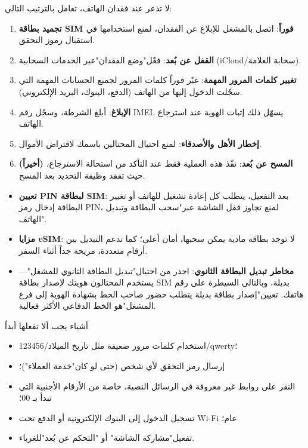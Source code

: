 
لا تذعر عند فقدان الهاتف، تعامل بالترتيب التالي:

\begin{enumerate}
  \item \textbf{تجميد بطاقة SIM فوراً}: اتصل بالمشغل للإبلاغ عن الفقدان، لمنع استخدامها في استقبال رموز التحقق.
  \item \textbf{القفل عن بُعد}: فعّل"وضع الفقدان"عبر الخدمات السحابية (iCloud/سحابة العلامة).
  \item \textbf{تغيير كلمات المرور المهمة}: غيّر فوراً كلمات المرور لجميع الحسابات المهمة التي سجّلت الدخول إليها من الهاتف (الدفع، البنوك، البريد الإلكتروني).
  \item \textbf{الإبلاغ}: أبلغ الشرطة، وسجّل رقم IMEI. يسهّل ذلك إثبات الهوية عند استرجاع الهاتف.
  \item \textbf{إخطار الأهل والأصدقاء}: لمنع احتيال المحتالين باسمك لاقتراض الأموال.
  \item \textbf{(أخيراً) المسح عن بُعد}: نفّذ هذه العملية فقط عند التأكد من استحالة الاسترجاع، حيث تفقد وظيفة التحديد بعد المسح.
\end{enumerate}


\begin{itemize}
  \item \textbf{تعيين PIN لبطاقة SIM}: بعد التفعيل، يتطلب كل إعادة تشغيل للهاتف أو تغيير البطاقة إدخال رمز PIN، لمنع تجاوز قفل الشاشة عبر"سحب البطاقة وتبديل الهاتف".
  \item \textbf{مزايا eSIM}: لا توجد بطاقة مادية يمكن سحبها، أمان أعلى؛ كما تدعم التبديل بين أرقام متعددة، مريحة جداً أثناء السفر.
  \item \textbf{مخاطر تبديل البطاقة الثانوي}: احذر من احتيال"تبديل البطاقة الثانوي للمشغل"— يستخدم المحتالون هويتك لإصدار بطاقة SIM بديلة، وبالتالي السيطرة على رقم هاتفك. تعيين"إصدار بطاقة بديلة يتطلب حضور صاحب الخط بشهادة الهوية إلى فرع المشغل"هو الخط الدفاعي الأكثر فعالية.
\end{itemize}

\begin{tcbwarn}{أشياء يجب ألا تفعلها أبداً}
\begin{itemize}
  \item استخدام كلمات مرور ضعيفة مثل تاريخ الميلاد/123456/qwerty؛
  \item إرسال رمز التحقق لأي شخص (حتى لو كان"خدمة العملاء")؛
  \item النقر على روابط غير معروفة في الرسائل النصية، خاصة من الأرقام الأجنبية التي تبدأ بـ 00؛
  \item تسجيل الدخول إلى البنوك الإلكترونية أو الدفع تحت Wi-Fi عام؛
  \item تفعيل"مشاركة الشاشة" أو "التحكم عن بُعد"للغرباء.
\end{itemize}

\end{tcbwarn}

